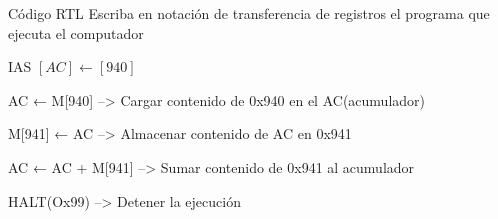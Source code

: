 \documentclass{article}
\begin{document}
\begin{frame}[label={sec:orge4c0327}]{Código RTL}
Escriba en notación de transferencia de registros el programa que
ejecuta el computador


IAS \([AC] \leftarrow [940]\)

AC ← M[940]      -->  Cargar contenido de 0x940 en el AC(acumulador)

M[941] ← AC      -->  Almacenar contenido de AC en 0x941

AC ← AC + M[941] -->  Sumar contenido de 0x941 al acumulador

HALT(Ox99)       -->  Detener la ejecución


\printbibliography
\end{frame}
\end{document}
